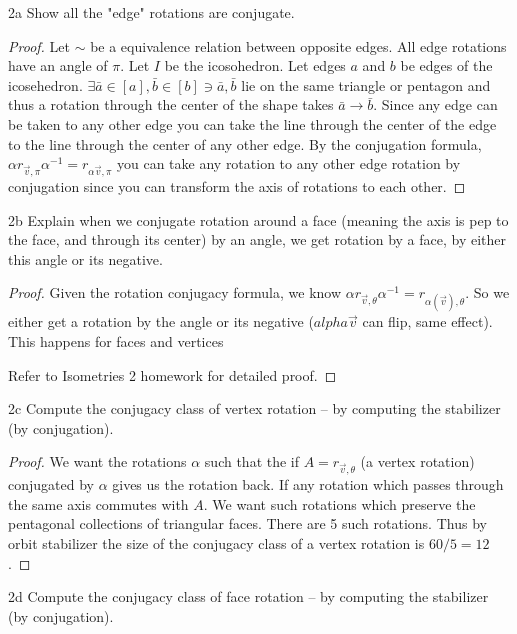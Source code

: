 \documentclass{article}
\begin{document}
\begin{PROB}{2a}\label{Problem 2a.}
    Show all the "edge" rotations are conjugate.
\end{PROB}
\begin{proof}
    Let $\sim$ be a equivalence relation between opposite edges. All edge rotations have an angle of $\pi$. Let $I$ be the icosohedron. Let edges $a$ and $b$ be edges of the icosehedron. $\exists \bar a \in [a], \bar b \in [b] \ni \bar a, \bar b$ lie on the same triangle or pentagon and thus a rotation through the center of the shape takes $\bar a \to \bar b$. Since any edge can be taken to any other edge you can take the line through the center of the edge to the line through the center of any other edge. By the conjugation formula, $\alpha r_{\vec{v}, \pi} \alpha^{-1} = r_{\alpha{\vec{v}}, \pi}$ you can take any rotation to any other edge rotation by conjugation since you can transform the axis of rotations to each other.
\end{proof}
\begin{PROB}{2b}\label{Problem 2b.}
    Explain when we conjugate rotation around a face (meaning the axis is pep to the face, and through its center) by an angle, we get rotation by a face, by either this angle or its negative.
\end{PROB}
\begin{proof}
    Given the rotation conjugacy formula, we know $\alpha r_{\vec{v}, \theta} \alpha^{-1} = r_{\alpha(\vec{v}), \theta}$. So we either get a rotation by the angle or its negative ($alpha{\vec{v}}$ can flip, same effect). This happens for faces and vertices
    
    
    Refer to Isometries 2 homework for detailed proof.
\end{proof}
\begin{PROB}{2c}\label{Problem 2c.}
    Compute the conjugacy class of vertex rotation -- by computing the stabilizer (by conjugation).
\end{PROB}
\begin{proof}
    We want the rotations $\alpha$ such that the if $A = r_{\vec{v}, \theta}$ (a vertex rotation) conjugated by $\alpha$ gives us the rotation back. If any rotation which passes through the same axis commutes with $A$. We want such rotations which preserve the pentagonal collections of triangular faces. There are 5 such rotations. Thus by orbit stabilizer the size of the conjugacy class of a vertex rotation is $60/5 = 12$. 
\end{proof}
\begin{PROB}{2d}\label{Problem 2d.}
    Compute the conjugacy class of face rotation -- by computing the stabilizer (by conjugation).
\end{PROB}
\end{document}
